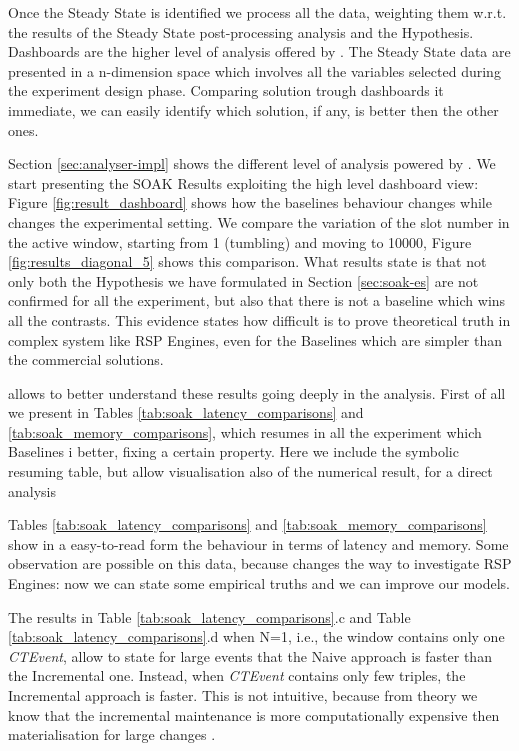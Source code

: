 Once the Steady State is identified we process all the data, weighting them w.r.t. the results of the Steady State post-processing analysis and the Hypothesis. Dashboards are the higher level of analysis offered by \namens. The Steady State data are presented in a n-dimension space which involves all the variables selected during the experiment design phase. Comparing solution trough dashboards it immediate, we can easily identify which solution, if any, is better then the other ones.

Section \ref{sec:analyser-impl} shows the different level of analysis powered by \namens. We start presenting the SOAK Results exploiting the high level dashboard view: Figure \ref{fig:result_dashboard} shows how the baselines behaviour changes while changes the experimental setting. We compare the variation of the slot number in the active window, starting from 1 (tumbling) and moving to 10000, Figure \ref{fig:results_diagonal_5} shows this comparison.
What results state is that not only both the Hypothesis we have formulated in Section \ref{sec:soak-es} are not confirmed for all the experiment, but also that there is not a baseline which wins all the contrasts. This evidence states how difficult is to prove theoretical truth in complex system like RSP Engines, even for the Baselines which are simpler than the commercial solutions.

\name allows to better understand these results going deeply in the analysis. First of all we present in Tables \ref{tab:soak_latency_comparisons} and \ref{tab:soak_memory_comparisons}, which resumes in all the experiment which Baselines i better, fixing a certain property. Here we include the symbolic resuming table, but \name allow visualisation also of the numerical result, for a direct analysis

Tables \ref{tab:soak_latency_comparisons}  and \ref{tab:soak_memory_comparisons} show in a easy-to-read form the behaviour in terms of latency and memory. Some observation are possible on this data, because \name changes the way to investigate RSP Engines: now we can state some empirical truths and we can improve our models. 

The results in Table \ref{tab:soak_latency_comparisons}.c and Table \ref{tab:soak_latency_comparisons}.d when N=1, i.e., the window contains only one \textit{CTEvent},  allow to state for large events that the Naive approach is faster than the Incremental one. Instead, when \textit{CTEvent} contains only few triples, the Incremental approach is faster. This is not intuitive, because from theory we know that the incremental maintenance is more computationally expensive then materialisation for large changes \cite{DellAglio2014,DBLP:conf/cikm/RenP11,DBLP:conf/semweb/UrbaniMJHB13}.

